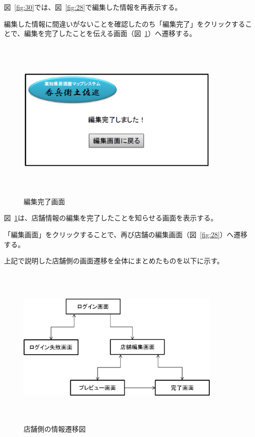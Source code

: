 \documentclass[a4j,titlepage]{jarticle}
\begin{document}
\clearpage
図~\ref{fig:30}では、図~\ref{fig:28}で編集した情報を再表示する。



編集した情報に間違いがないことを確認したのち「編集完了」をクリックすることで、編集を完了したことを伝える画面（図~\ref{fig:31}）へ遷移する。



\begin {figure}[!htbp]
    \begin{center}
    \includegraphics [height=8cm, width=10cm]{31.eps}
    \caption {編集完了画面}
    \label {fig:31}
    \end{center}
\end {figure}



図~\ref{fig:31}は、店舗情報の編集を完了したことを知らせる画面を表示する。



「編集画面」をクリックすることで、再び店舗の編集画面（図~\ref{fig:28}）へ遷移する。
\clearpage

上記で説明した店舗側の画面遷移を全体にまとめたものを以下に示す。
\begin {figure}[!htbp]
    \begin{center}
    \includegraphics [height=8cm, width=10cm]{32.eps}
    \caption {店舗側の情報遷移図}
    \label {fig:32}
    \end{center}
\end {figure}
\end{document}

